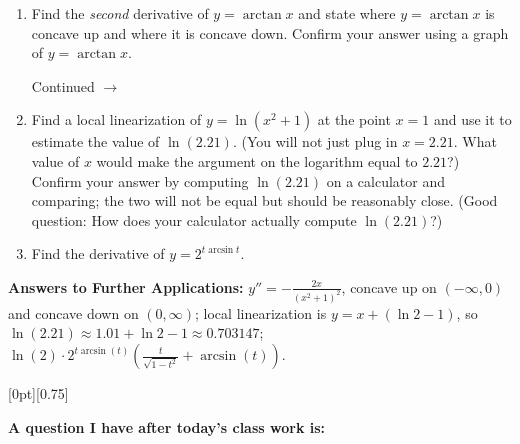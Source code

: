 \documentclass[11pt]{article}
\newcommand{\cuthere}{%
\noindent
\raisebox{-2.8pt}[0pt][0.75\baselineskip]{\small\ding{34}}
\unskip{\tiny\dotfill}
}
\def\ra{\rightarrow}
\def\pageturn{\vfill 
\begin{flushright}
	\begin{small}
		Continued $\ra$
	\end{small}
\end{flushright} \newpage}
\begin{document}
\begin{enumerate}
	\item Find the \emph{second} derivative of $y = \arctan x$ and state where $y = \arctan x$ is concave up and where it is concave down. Confirm your answer using a graph of $y = \arctan x$. 
	
	\pageturn
	
	\item Find a local linearization of $y = \ln(x^2 + 1)$ at the point $x = 1$ and use it to estimate the value of $\ln(2.21)$. (You will not just plug in $x = 2.21$. What value of $x$ would make the argument on the logarithm equal to $2.21$?) Confirm your answer by computing $\ln(2.21)$ on a calculator and comparing; the two will not be equal but should be reasonably close. (Good question: How does your calculator actually compute $\ln(2.21)$?) 
	
	
	\vspace{3in}

	\item Find the derivative of $y = 2^{t \arcsin t}$. 

\end{enumerate}

\vfill

\textbf{Answers to Further Applications:} $y'' = -\frac{2 x}{\left(x^2+1\right)^2}$, concave up on $(-\infty, 0)$ and concave down on $(0, \infty)$; local linearization is $y = x + (\ln 2 - 1)$, so $\ln(2.21) \approx 1.01 + \ln 2 - 1 \approx 0.703147$; $\ln (2) \cdot 2^{t \arcsin(t)} \left(\frac{t}{\sqrt{1-t^2}}+\arcsin(t)\right)$. 

\cuthere

\noindent
\textbf{A question I have after today's class work is:}

\vspace{1in}
\end{document}
